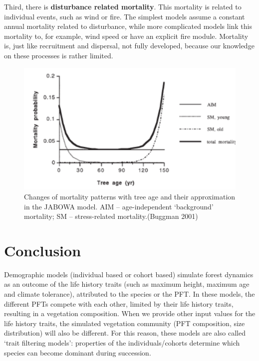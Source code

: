\documentclass[12pt,oneside]{book}
\begin{document}
Third, there is \textbf{disturbance related mortality}. This mortality
is related to individual events, such as wind or fire. The simplest
models assume a constant annual mortality related to disturbance, while
more complicated models link this mortality to, for example, wind speed
or have an explicit fire module. Mortality is, just like recruitment and
dispersal, not fully developed, because our knowledge on these processes
is rather limited.

\begin{figure}

{\centering \includegraphics[width=0.8\linewidth]{figures/chap6/f632_mortality_jabowa} 

}

\caption{Changes of mortality patterns with tree age and their approximation in the JABOWA model. AIM – age-independent ‘background’ mortality; SM – stress-related mortality.(Buggman 2001)}\label{fig:f632}
\end{figure}

\section{Conclusion}\label{conclusion}

Demographic models (individual based or cohort based) simulate forest
dynamics as an outcome of the life history traits (such as maximum
height, maximum age and climate tolerance), attributed to the species or
the PFT. In these models, the different PFTs compete with each other,
limited by their life history traits, resulting in a vegetation
composition. When we provide other input values for the life history
traits, the simulated vegetation community (PFT composition, size
distribution) will also be different. For this reason, these models are
also called `trait filtering models': properties of the
individuals/cohorts determine which species can become dominant during
succession.
\end{document}
